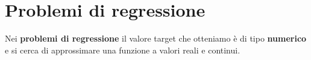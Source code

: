 \chapter{Problemi di regressione}
Nei \textbf{problemi di regressione} il valore target che otteniamo \`e di tipo \textbf{numerico} e si cerca di
approssimare una funzione a valori reali e continui.
